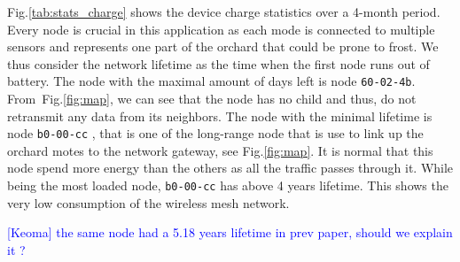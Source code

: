 \documentclass{sig-alternate}
\newcommand{\keoma}[1]       {\textcolor{blue}{[Keoma] #1}}
\begin{document}
Fig.\ref{tab:stats_charge} shows the device charge statistics over a 4-month period.
Every node is crucial in this application as each mode is connected to multiple sensors and represents one part of the orchard that could be prone to frost.
We thus consider the network lifetime as the time when the first node runs out of battery.
The node with the maximal amount of days left is node {\tt 60-02-4b}.
From~Fig.\ref{fig:map}, we can see that the node has no child and thus, do not retransmit any data from its neighbors.
The node with the minimal lifetime is node {\tt b0-00-cc} , that is one of the long-range node that is use to link up the orchard motes to the network gateway, see Fig.\ref{fig:map}.
It is normal that this node spend more energy than the others as all the traffic passes through it.
While being the most loaded node, {\tt b0-00-cc} has above 4 years lifetime.
This shows the very low consumption of the wireless mesh network.

\keoma{the same node had a 5.18 years lifetime in prev paper, should we explain it ?}
\end{document}
